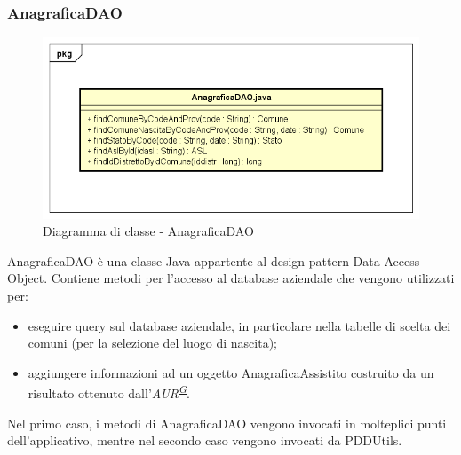 \documentclass[a4paper]{article}
\begin{document}
\subsubsection{AnagraficaDAO}
\begin{figure}[H]
	\centering
	\includegraphics[width=\linewidth]{uml/anagraficadao.png}
	\caption{Diagramma di classe - AnagraficaDAO}
\end{figure}
AnagraficaDAO è una classe Java appartente al design pattern Data Access Object. Contiene metodi per l'accesso al database aziendale che vengono utilizzati per:
\begin{itemize}
    \item eseguire query sul database aziendale, in particolare nella tabelle di scelta dei comuni (per la selezione del luogo di nascita);
    \item aggiungere informazioni ad un oggetto AnagraficaAssistito costruito da un risultato ottenuto dall'\textit{AUR\textsuperscript{\hyperref[sec:gl]{G}}}.
\end{itemize}
Nel primo caso, i metodi di AnagraficaDAO vengono invocati in molteplici punti dell'applicativo, mentre nel secondo caso vengono invocati da PDDUtils.
\end{document}
